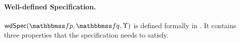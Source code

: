 
\paragraph{\textbf{Well-defined Specification.}}
$\wdSpec{\relspecpre}{\relspecpost}{\hprim}$
is defined formally in
\Def{\ref{def:well-defined specification}}.
It contains three properties that
the specification needs to satisfy.

